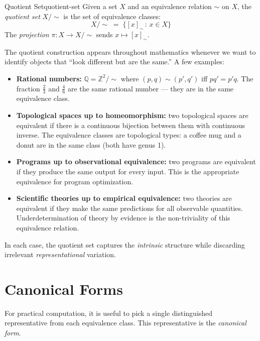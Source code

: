 \begin{definition}{Quotient Set}{quotient-set}
  Given a set $X$ and an equivalence relation $\sim$ on $X$, the
  \emph{quotient set} $X/{\sim}$ is the set of equivalence classes:
  \[
    X/{\sim} \;=\; \bigl\{ [x]_\sim \,:\, x \in X \bigr\}
  \]
  The \emph{projection} $\pi : X \to X/{\sim}$ sends $x \mapsto [x]_\sim$.
\end{definition}

The quotient construction appears throughout mathematics whenever we want
to identify objects that ``look different but are the same.'' A few examples:

\begin{itemize}
  \item \textbf{Rational numbers:} $\mathbb{Q} = \mathbb{Z}^2 / {\sim}$
        where $(p,q) \sim (p',q')$ iff $pq' = p'q$. The fraction
        $\tfrac{2}{3}$ and $\tfrac{4}{6}$ are the same rational number
        — they are in the same equivalence class.
  \item \textbf{Topological spaces up to homeomorphism:} two topological
        spaces are equivalent if there is a continuous bijection between
        them with continuous inverse. The equivalence classes are
        topological types: a coffee mug and a donut are in the same
        class (both have genus 1).
  \item \textbf{Programs up to observational equivalence:} two programs
        are equivalent if they produce the same output for every input.
        This is the appropriate equivalence for program optimization.
  \item \textbf{Scientific theories up to empirical equivalence:}
        two theories are equivalent if they make the same predictions
        for all observable quantities. Underdetermination of theory
        by evidence is the non-triviality of this equivalence relation.
\end{itemize}

In each case, the quotient set captures the \emph{intrinsic} structure
while discarding irrelevant \emph{representational} variation.

\section{Canonical Forms}

For practical computation, it is useful to pick a single distinguished
representative from each equivalence class. This representative is the
\emph{canonical form}.

